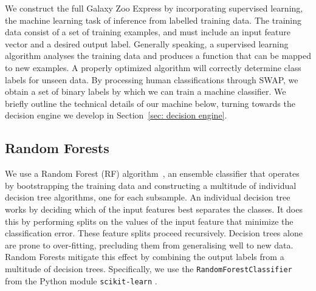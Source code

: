 \documentclass[twocolumn,  trackchanges, ]{aastex6}%
\begin{document}
We construct the full Galaxy Zoo Express by incorporating supervised learning, the machine learning task of inference from labelled training data. The training data consist of a set of training examples, and must include an input feature vector and a desired output label.  Generally speaking, a supervised learning algorithm analyses the training data and produces a function that can be mapped to new examples. A properly optimized algorithm will correctly determine class labels for unseen data. By processing human classifications through SWAP, we obtain a set of binary labels by which we can train a machine classifier. We briefly outline the technical details of our machine below,  turning towards the decision engine we develop in Section~\ref{sec: decision engine}. 

\subsection{Random Forests}
We use a Random Forest (RF) algorithm~\citep{Breiman2001},  an ensemble classifier that operates by bootstrapping the training data and constructing a multitude of individual decision tree algorithms, one for each subsample.  An individual decision tree works by deciding which of the input features best separates the classes. It does this by performing splits on the values of the input feature that minimize the classification error. These feature splits proceed recursively. Decision trees alone are prone to over-fitting, precluding them from generalising well to new data. Random Forests mitigate this effect by combining the output labels from a multitude of decision trees.  Specifically, we use the \texttt{RandomForestClassifier} from the Python module \texttt{scikit-learn} \citep{scikit-learn}. 


\end{document}
